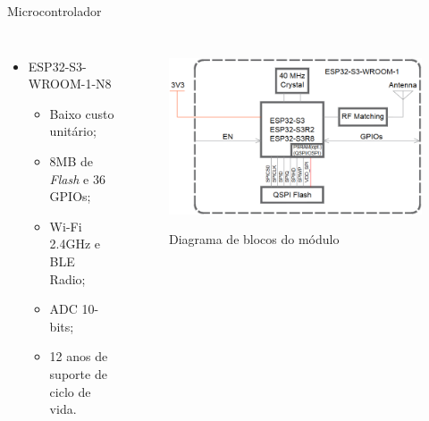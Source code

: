 \begin{frame}{Microcontrolador}


\begin{columns}
        
    \justify 
    \begin{itemize}
        \item ESP32-S3-WROOM-1-N8
        \begin{itemize}
            \item Baixo custo unitário;
            \item 8MB de \textit{Flash} e 36 GPIOs;
            \item Wi-Fi 2.4GHz e BLE Radio;
            \item ADC 10-bits;
            \item 12 anos de suporte de ciclo de vida.
        \end{itemize}
    \end{itemize}
    
    \justify
    \begin{figure}
        \caption{Diagrama de blocos do módulo}
        \includegraphics[scale=0.35]{figuras/cap3/modulo_block_diagram.png}
        \label{fig:soc_esp32}
    \end{figure}
\end{columns}
\end{frame}

